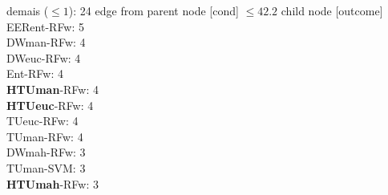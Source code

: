 {{{{%
demais ($\leq 1$): 24} edge from parent node [cond] {$\leq42.2$}}
child {node [outcome] {
EERent-RFw: 5\\
DWman-RFw: 4\\
DWeuc-RFw: 4\\
Ent-RFw: 4\\
\textbf{HTUman}-RFw: 4\\
\textbf{HTUeuc}-RFw: 4\\
TUeuc-RFw: 4\\
TUman-RFw: 4\\
DWmah-RFw: 3\\
TUman-SVM: 3\\
\textbf{HTUmah}-RFw: 3\\
}}}}
